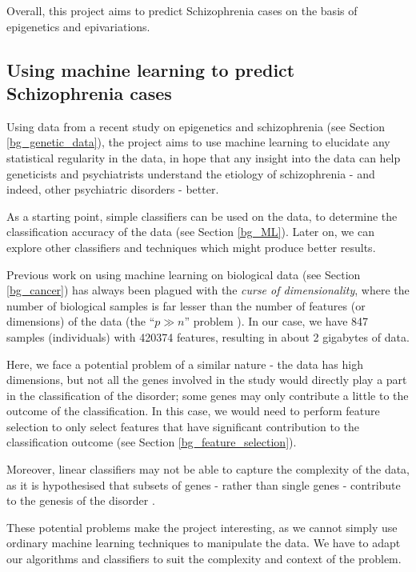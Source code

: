 \documentclass[12pt, twoside, a4paper]{article}
\begin{document}
Overall, this project aims to predict Schizophrenia cases on the basis of epigenetics and epivariations.


\subsection{Using machine learning to predict Schizophrenia cases} \label{intro_ML}

Using data from a recent study on epigenetics and schizophrenia (see Section \ref{bg_genetic_data}), the project aims to use machine learning to elucidate any statistical regularity in the data, in hope that any insight into the data can help geneticists and psychiatrists understand the etiology of schizophrenia - and indeed, other psychiatric disorders - better.

As a starting point, simple classifiers can be used on the data, to determine the classification accuracy of the data (see Section \ref{bg_ML}). Later on, we can explore other classifiers and techniques which might produce better results.

Previous work on using machine learning on biological data (see Section \ref{bg_cancer}) has always been plagued with the \textit{curse of dimensionality}, where the number of biological samples is far lesser than the number of features (or dimensions) of the data (the ``$p \gg n$'' problem \cite{RefWorks:96}). In our case, we have 847 samples (individuals) with 420374 features, resulting in about 2 gigabytes of data.

Here, we face a potential problem of a similar nature - the data has high dimensions, but not all the genes involved in the study would directly play a part in the classification of the disorder; some genes may only contribute a little to the outcome of the classification. In this case, we would need to perform feature selection to only select features that have significant contribution to the classification outcome (see Section \ref{bg_feature_selection}).

Moreover, linear classifiers may not be able to capture the complexity of the data, as it is hypothesised that subsets of genes - rather than single genes - contribute to the genesis of the disorder \cite{RefWorks:10}.

These potential problems make the project interesting, as we cannot simply use ordinary machine learning techniques to manipulate the data. We have to adapt our algorithms and classifiers to suit the complexity and context of the problem.
\end{document}
